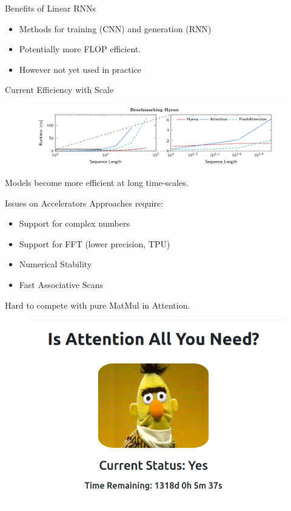 

\begin{frame}{Benefits of Linear RNNs}
    \begin{itemize}
        \item Methods for training (CNN) and generation (RNN)
        \item Potentially more FLOP efficient. 
        \item However not yet used in practice 
    \end{itemize}    
\end{frame}

\begin{frame}[c]{Current Efficiency with Scale \cite{Poli2023-ag}}
\begin{figure}
    \centering
    \includegraphics[width=\textwidth]{Figs/hyena.png}
    \caption{}
\end{figure}
 Models become more efficient at long time-scales.
\end{frame}

\begin{frame}{Issues on Accelerators}
    Approaches require:
    \vspace{0.5cm}

    \begin{itemize}
        \item Support for complex numbers
        \item Support for FFT (lower precision, TPU)
        \item Numerical Stability
        \item Fast Associative Scans 
    \end{itemize}
    \vspace{0.5cm}
    
    Hard to compete with pure MatMul in Attention.
\end{frame}

\begin{frame}{}
    \begin{figure}
        \centering
        \includegraphics[width=0.7\linewidth,clip,  trim={0.1cm 0.1cm 0.1cm 0.1cm}]{Figs/Is-Attention-All-You-Need-.png}
        \label{fig:my_label}
    \end{figure}
\end{frame}


